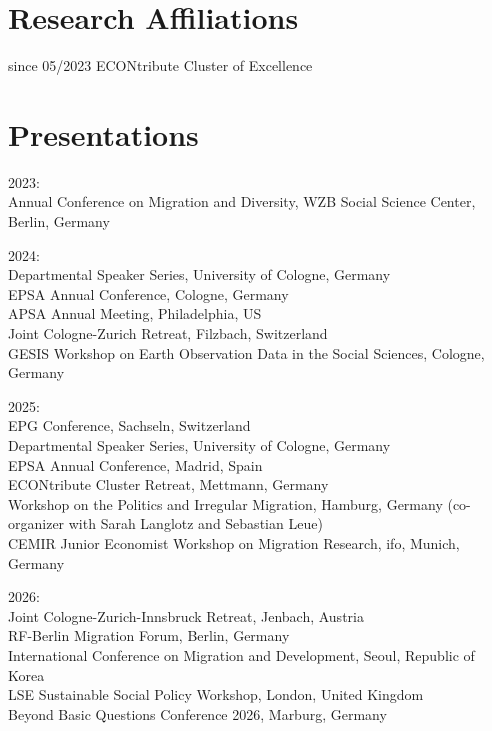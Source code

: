 \documentclass[a4paper,11pt]{article}
\begin{document}
\section{Research Affiliations}

since 05/2023 \hfill ECONtribute Cluster of Excellence

\vspace{6pt}

\section{Presentations}

2023:\\
Annual Conference on Migration and Diversity, WZB Social Science Center, Berlin, Germany

\vspace{6pt}

2024:\\
Departmental Speaker Series, University of Cologne, Germany\\
EPSA Annual Conference, Cologne, Germany\\
APSA Annual Meeting, Philadelphia, US\\
Joint Cologne-Zurich Retreat, Filzbach, Switzerland\\
GESIS Workshop on Earth Observation Data in the Social Sciences, Cologne, Germany

\vspace{6pt}

2025:\\
EPG Conference, Sachseln, Switzerland\\
Departmental Speaker Series, University of Cologne, Germany\\
EPSA Annual Conference, Madrid, Spain\\
ECONtribute Cluster Retreat, Mettmann, Germany\\
Workshop on the Politics and Irregular Migration, Hamburg, Germany (co-organizer with Sarah Langlotz and Sebastian Leue)\\
CEMIR Junior Economist Workshop on Migration Research, ifo, Munich, Germany

\vspace{6pt}

2026:\\
Joint Cologne-Zurich-Innsbruck Retreat, Jenbach, Austria\\
RF-Berlin Migration Forum, Berlin, Germany\\
International Conference on Migration and Development, Seoul, Republic of Korea\\
LSE Sustainable Social Policy Workshop, London, United Kingdom\\
Beyond Basic Questions Conference 2026, Marburg, Germany
\end{document}
